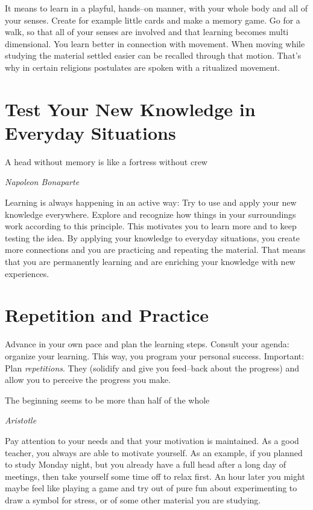 \documentclass[../main.tex]{subfiles}
\begin{document}
It means to learn in a {playful}, {hands--on} manner, with your {whole body and all of your senses}.
Create for example little cards and make a {memory game}. Go for a {walk}, so that all of your senses are involved and that learning becomes multi dimensional.
You {learn better} {in connection with movement}.
When moving while studying the material settled easier  can  be {recalled through that motion}.
{That's why in certain religions postulates are spoken with a ritualized movement.}

\section{Test Your New Knowledge in Everyday Situations}

\epigraph{A head without memory is like a fortress without crew}{\textit{Napoleon Bonaparte}}

Learning is always happening in an active way: Try to {use} and apply your new knowledge {everywhere}.
 Explore and recognize how {things in your surroundings} work according to this principle. 
 This {motivates you to learn} more and to keep testing the idea. 
 By applying your knowledge to everyday situations, you create more connections and you are  {practicing and repeating the material}.
 That means that you are permanently learning and are enriching your knowledge with new experiences.

 \section{Repetition and Practice}

Advance in your own pace and plan the learning steps.
 Consult your agenda: {organize your learning}.
This way, you {program your personal success}.
{Important:} Plan \emph{repetitions}. They (solidify and give you feed--back about the progress) and allow you to perceive the progress you make.

\epigraph{The beginning seems to be more than half of the whole}{\textit{Aristotle}}

Pay attention to your {needs} and that your motivation is maintained. As a good teacher, you always are able to {motivate yourself.}
As an example, if you planned to study Monday night, but you already have a full head after a long day of meetings, then take yourself some time off to relax first. An hour later you might maybe feel like playing a game and try out of pure fun about experimenting to draw a symbol for stress, or of some other material you are studying.
\end{document}
